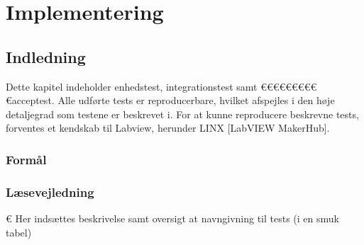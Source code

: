 \chapter{Implementering}
\renewcommand{\arraystretch}{1.5}


\section{Indledning}
	Dette kapitel indeholder enhedstest, integrationstest samt €€€€€€€€€€acceptest. Alle udførte tests er reproducerbare, hvilket afspejles i den høje detaljegrad som testene er beskrevet i. For at kunne reproducere beskrevne tests, forventes et kendskab til Labview, herunder LINX [LabVIEW MakerHub]. 
	
		\subsection{Formål}
	
		\subsection{Læsevejledning}	
	
	
	€ Her indsættes beskrivelse samt oversigt at navngivning til tests (i en smuk tabel)
	
